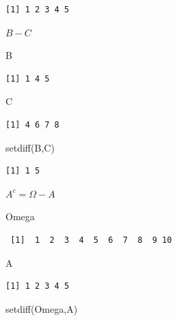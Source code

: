 \documentclass[
  letterpaper,
  DIV=11,
  numbers=noendperiod]{scrreprt}
\newenvironment{Shaded}{\begin{snugshade}}{\end{snugshade}}
\newcommand{\FunctionTok}[1]{\textcolor[rgb]{0.28,0.35,0.67}{#1}}
\newcommand{\NormalTok}[1]{\textcolor[rgb]{0.00,0.23,0.31}{#1}}
\begin{document}
\begin{verbatim}
[1] 1 2 3 4 5
\end{verbatim}

\(B-C\)

\begin{Shaded}
\begin{Highlighting}[]
\NormalTok{B}
\end{Highlighting}
\end{Shaded}

\begin{verbatim}
[1] 1 4 5
\end{verbatim}

\begin{Shaded}
\begin{Highlighting}[]
\NormalTok{C}
\end{Highlighting}
\end{Shaded}

\begin{verbatim}
[1] 4 6 7 8
\end{verbatim}

\begin{Shaded}
\begin{Highlighting}[]
\FunctionTok{setdiff}\NormalTok{(B,C)}
\end{Highlighting}
\end{Shaded}

\begin{verbatim}
[1] 1 5
\end{verbatim}

\(A^c=\Omega-A\)

\begin{Shaded}
\begin{Highlighting}[]
\NormalTok{Omega}
\end{Highlighting}
\end{Shaded}

\begin{verbatim}
 [1]  1  2  3  4  5  6  7  8  9 10
\end{verbatim}

\begin{Shaded}
\begin{Highlighting}[]
\NormalTok{A}
\end{Highlighting}
\end{Shaded}

\begin{verbatim}
[1] 1 2 3 4 5
\end{verbatim}

\begin{Shaded}
\begin{Highlighting}[]
\FunctionTok{setdiff}\NormalTok{(Omega,A)}
\end{Highlighting}
\end{Shaded}
\end{document}
